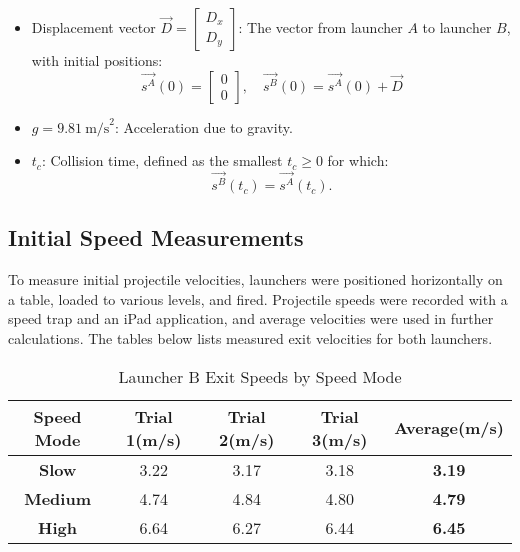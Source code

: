 \documentclass[12pt]{article}
\begin{document}
\begin{itemize}
    \item Displacement vector \(\vec{D} = \begin{bmatrix} D_x \\ D_y \end{bmatrix}\): The vector from launcher \(A\) to launcher \(B\), with initial positions:
    \[
    \vec{s^A}(0) = \begin{bmatrix} 0 \\ 0 \end{bmatrix}, \quad \vec{s^B}(0) = \vec{s^A}(0) + \vec{D}
    \]
    \item \(g = 9.81 \ \text{m/s}^2\): Acceleration due to gravity.
    \item \(t_c\): Collision time, defined as the smallest \( t_c \geq 0 \) for which:
    \[
    \vec{s^B}(t_c) = \vec{s^A}(t_c).
    \]
\end{itemize}

\subsection{Initial Speed Measurements}
To measure initial projectile velocities, launchers were positioned horizontally on a table, loaded to various levels, and fired. Projectile speeds were recorded with a speed trap and an iPad application, and average velocities were used in further calculations. The tables below lists measured exit velocities for both launchers.

\renewcommand{\arraystretch}{1.1 }
\begin{table}[H]
    \centering
    \begin{tabular}{|c|c|c|c|c|}
        \hline
        \textbf{Speed Mode} & \textbf{Trial 1}(m/s) & \textbf{Trial 2}(m/s) & \textbf{Trial 3}(m/s) & \textbf{Average}(m/s)\\ 
        \hline
        \textbf{Slow} & 3.22 & 3.17 & 3.18 & \textbf{3.19} \\ 
        \hline
        \textbf{Medium} & 4.74 & 4.84 & 4.80 & \textbf{4.79} \\ 
        \hline
        \textbf{High} & 6.64 & 6.27 & 6.44 & \textbf{6.45} \\ 
        \hline
    \end{tabular}
    \caption{Launcher B Exit Speeds by Speed Mode}
    \label{table:ISA}
\end{table}
\end{document}
